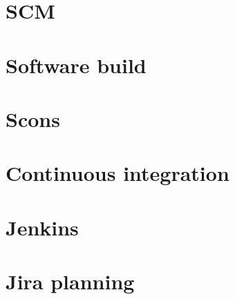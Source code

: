 \documentclass[../main.tex]{subfiles}
\begin{document}
\section{SCM}
\section{Software build}
\section{Scons}
\section{Continuous integration}
\section{Jenkins}
\section{Jira planning}
\cleardoublepage
\end{document}
